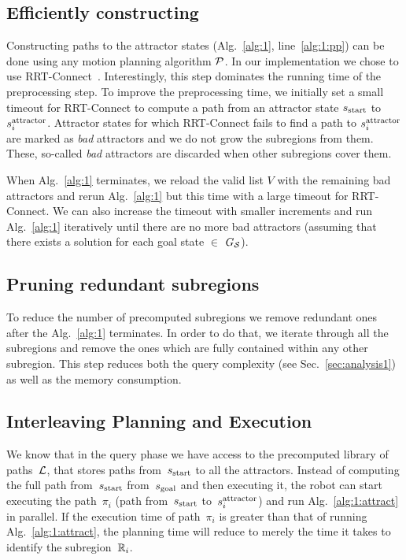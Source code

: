 \documentclass[a4paper]{report}
\begin{document}
\subsection{Efficiently constructing \calL}
Constructing paths to the attractor states (Alg.~\ref{alg:1}, line~\ref{alg:1:pp}) can be done using any motion planning algorithm $\mathcal{P}$.
In our implementation we chose to use RRT-Connect~\cite{KL00}.
Interestingly, this step dominates the running time of the preprocessing step.
%
To improve the preprocessing time, we initially set a small timeout for RRT-Connect to compute a path from an attractor state $s_{\textrm{start}}$ to $s^{\text{attractor}}_i$.
Attractor states for which RRT-Connect fails to find a path to $s^{\text{attractor}}_i$ are marked as \textit{bad} attractors and we do not grow the subregions from them. 
These, so-called \textit{bad} attractors are discarded when other subregions cover them.

When Alg.~\ref{alg:1} terminates, we reload the valid list $V$ with the remaining bad attractors and rerun Alg.~\ref{alg:1} but this time with a large timeout for RRT-Connect. 
%
We can also increase the timeout with smaller increments and run Alg.~\ref{alg:1} iteratively until there are no more bad attractors (assuming that there exists a solution for each goal state $\in$ $G_\mathcal{S}$).


\subsection{Pruning redundant subregions}
To reduce the number of precomputed subregions we remove redundant ones after the Alg.~\ref{alg:1} terminates. 
In order to do that, we iterate through all the subregions and remove the ones which are fully contained within any other subregion. 
This step reduces both the query complexity (see Sec.~\ref{sec:analysis1}) as well as the memory consumption.

\subsection{Interleaving Planning and Execution}
\label{subsubsec:interleave}
We know that in the query phase we have access to the precomputed library of paths~$\mathcal{L}$, that stores paths from~$s_{\text{start}}$ to all the attractors. Instead of computing the full path from~$s_{\text{start}}$ from~$s_{\text{goal}}$ and then executing it, the robot can start executing the path~$\pi_i$ (path from~$s_{\text{start}}$ to~$s^{\text{attractor}}_i$) and run Alg.~\ref{alg:1:attract} in parallel. If the execution time of path~$\pi_i$ is greater than that of running Alg.~\ref{alg:1:attract}, the planning time will reduce to merely the time it takes to identify the subregion~$\mathbb{R}_i$.
\end{document}
